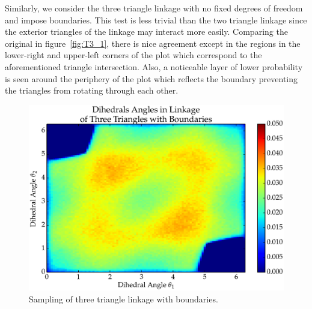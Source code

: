 Similarly, we consider the three triangle linkage with no fixed degrees of freedom and impose boundaries. This test is less trivial than the two triangle linkage since the exterior triangles of the linkage may interact more easily. Comparing the original in figure~\ref{fig:T3_1}, there is nice agreement except in the regions in the lower-right and upper-left corners of the plot which correspond to the aforementioned triangle intersection. Also, a noticeable layer of lower probability is seen around the periphery of the plot which reflects the boundary preventing the triangles from rotating through each other.
\begin{figure}[ht]
\centering
  \includegraphics[scale=0.6]{images/T3_2_2D.eps}
\caption{Sampling of three triangle linkage with boundaries.}
\label{fig:T3_2}
\end{figure}

